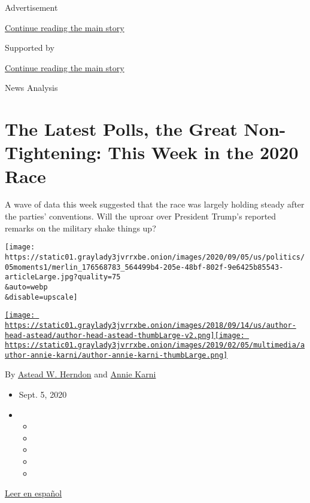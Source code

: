 Advertisement

\protect\hyperlink{after-top}{Continue reading the main story}

Supported by

\protect\hyperlink{after-sponsor}{Continue reading the main story}

News Analysis

\hypertarget{the-latest-polls-the-great-non-tightening-this-week-in-the-2020-race}{%
\section{The Latest Polls, the Great Non-Tightening: This Week in the
2020
Race}\label{the-latest-polls-the-great-non-tightening-this-week-in-the-2020-race}}

A wave of data this week suggested that the race was largely holding
steady after the parties' conventions. Will the uproar over President
Trump's reported remarks on the military shake things up?

\texttt{[image: https://static01.graylady3jvrrxbe.onion/images/2020/09/05/us/politics/05moments1/merlin\_176568783\_564499b4-205e-48bf-802f-9e6425b85543-articleLarge.jpg?quality=75\\\&auto=webp\\\&disable=upscale]}

\href{https://www.nytimes3xbfgragh.onion/by/astead-w-herndon}{\texttt{[image: https://static01.graylady3jvrrxbe.onion/images/2018/09/14/us/author-head-astead/author-head-astead-thumbLarge-v2.png]}}\href{https://www.nytimes3xbfgragh.onion/by/annie-karni}{\texttt{[image: https://static01.graylady3jvrrxbe.onion/images/2019/02/05/multimedia/author-annie-karni/author-annie-karni-thumbLarge.png]}}

By \href{https://www.nytimes3xbfgragh.onion/by/astead-w-herndon}{Astead
W. Herndon} and
\href{https://www.nytimes3xbfgragh.onion/by/annie-karni}{Annie Karni}

\begin{itemize}
\item
  Sept. 5, 2020
\item
  \begin{itemize}
  \item
  \item
  \item
  \item
  \item
  \end{itemize}
\end{itemize}

\href{https://www.nytimes3xbfgragh.onion/es/2020/09/07/espanol/estados-unidos/trump-biden-encuestas-elecciones.html}{Leer
en español}

